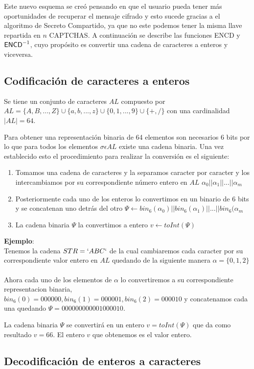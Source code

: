 Este nuevo esquema se cre\'o pensando en que el usuario pueda tener más oportunidades de recuperar el mensaje cifrado y esto sucede gracias a el algoritmo de Secreto Compartido, ya que no este podemos tener la misma llave repartida en $n$ CAPTCHAS. A continuaci\'on se describe las funciones {\sf ENCD} y ${\sf ENCD}^{-1}$, cuyo
prop\'osito es convertir una cadena de caracteres a enteros y viceversa. 

\subsection{Codificaci\'on de caracteres a enteros}
Se tiene un conjunto de caracteres $AL$ compuesto por $AL=\{A,B,...,Z\}\cup\{a,b,...,z\}\cup\{0,1,...,9\}\cup\{+,/\}$ con una cardinalidad $|AL|=64$.

Para obtener una representación binaria de 64 elementos son necesarios 6 bits por lo que para todos los elementos $\sigma\epsilon AL$ existe una cadena binaria. Una vez establecido esto el procedimiento para realizar la conversión es el siguiente:
\begin{enumerate}
 \item Tomamos una cadena de caracteres y la separamos caracter por caracter y los intercambiamos por su correspondiente número entero en $AL$ $\alpha _0||\alpha _1||...||\alpha _m$
 \item Posteriormente cada uno de los enteros lo convertimos en un binario de 6 bits y se concatenan uno detrás del otro $\Psi\longleftarrow bin_6(\alpha _0)||bin_6(\alpha _1)||...||bin_6(\alpha _m$
 \item La cadena binaria $\Psi$ la convertimos a entero $v\longleftarrow toInt(\Psi)$
\end{enumerate}
\textbf{Ejemplo}:\\
Tenemos la cadena $STR=`ABC`$ de la cual cambiaremos cada caracter por su correspondiente valor entero en $AL$ quedando de la siguiente manera $\alpha =\{0,1,2\}$
\\ 
\\
Ahora cada  uno de los elementos de $\alpha$ lo convertiremos a su correspondiente representacion binaria, $bin_6(0)=000000, bin_6(1)=000001, bin_6(2)=000010$ y concatenamos cada una quedando $\Psi = 000000000001000010$. 


La cadena binaria $\Psi$ se convertirá en un entero $v=toInt(\Psi )$ que da como resultado $v=66$. El entero $v$ que obtenemos es el valor entero.

\subsection{Decodificación de enteros a caracteres}

